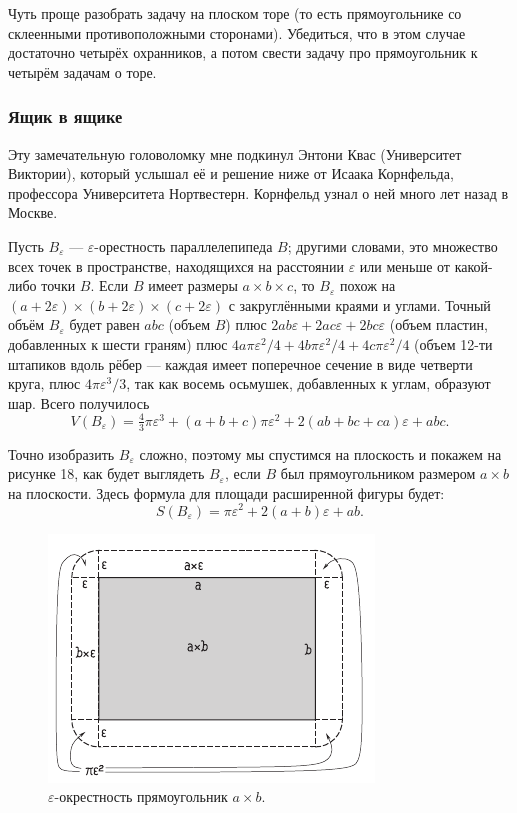 \begin{addedbytheeditors}
Чуть проще разобрать задачу на плоском торе (то есть прямоугольнике со склеенными противоположными сторонами).
Убедиться, что в этом случае достаточно четырёх охранников, а потом свести задачу про прямоугольник к четырём задачам о торе.
\end{addedbytheeditors}



\subsubsection*{Ящик в ящике}

Эту замечательную головоломку мне подкинул Энтони Квас (Университет Виктории), который услышал её и решение ниже от Исаака Корнфельда, профессора Университета Нортвестерн.
Корнфельд узнал о ней много лет назад в Москве.

Пусть $B_\varepsilon$ --- $\varepsilon$-орестность параллелепипеда $B$;
другими словами, это множество всех точек в пространстве, находящихся на расстоянии $\varepsilon$ или меньше от какой-либо точки $B$.
Если $B$ имеет размеры $a \times b \times c$, то $B_\varepsilon$ похож на $(a + 2\varepsilon) \times (b + 2\varepsilon) \times (c + 2\varepsilon)$ с закруглёнными краями и углами.
Точный объём $B_\varepsilon$ будет равен $abc$ (объем $B$) плюс $2ab\varepsilon + 2ac\varepsilon + 2bc\varepsilon$ (объем пластин, добавленных к шести граням) плюс $4a\pi\varepsilon^2 /4 + 4b\pi\varepsilon^2 /4 + 4c\pi\varepsilon^2 /4$ (объем 12-ти штапиков вдоль рёбер --- каждая имеет поперечное сечение в виде четверти круга, плюс $4\pi\varepsilon^3 /3$, так как восемь осьмушек, добавленных к углам, образуют шар.
Всего получилось
\[V(B_\varepsilon)=\tfrac43\pi\varepsilon^3+(a+b+c)\pi\varepsilon^2+2(ab+bc+ca)\varepsilon+abc.\]

Точно изобразить $B_\varepsilon$ сложно, поэтому мы спустимся на плоскость и покажем на рисунке 18, как будет выглядеть $B_\varepsilon$, если $B$ был прямоугольником размером $a \times b$ на плоскости.
Здесь формула для площади расширенной фигуры будет:
\[S(B_\varepsilon)=\pi\varepsilon^2+2(a+b)\varepsilon+ab.\]

\begin{figure}[ht!]
\centering
\includegraphics[scale=1]{pics/box}
\caption{$\varepsilon$-окрестность прямоугольник $a \times b$.}
\label{pic:box}
\end{figure}

